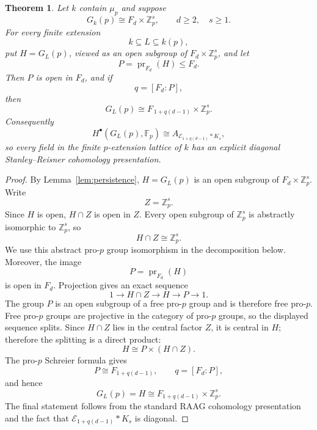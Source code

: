 \documentclass[10pt,a4paper]{amsart}
\newtheorem{theorem}{Theorem}
\newcommand{\Fp}{\mathbb{F}_p}
\begin{document}
\begin{theorem}
\label{thm:split-raag-lattice}
Let \(k\) contain \(\mu_p\) and suppose
\[
G_k(p)\cong F_d\times\mathbb Z_p^s,
\qquad d\ge2,\quad s\ge1.
\]
For every finite extension
\[
k\subseteq L\subseteq k(p),
\]
put \(H=G_L(p)\), viewed as an open subgroup of
\(F_d\times\mathbb Z_p^s\), and let
\[
P=\operatorname{pr}_{F_d}(H)\le F_d.
\]
Then \(P\) is open in \(F_d\), and if
\[
q=[F_d:P],
\]
then
\[
G_L(p)\cong F_{\,1+q(d-1)}\times\mathbb Z_p^s.
\]
Consequently
\[
H^\bullet(G_L(p),\Fp)
\cong
A_{\mathcal E_{1+q(d-1)}\ast K_s},
\]
so every field in the finite \(p\)-extension lattice of \(k\) has an
explicit diagonal Stanley--Reisner cohomology presentation.
\end{theorem}

\begin{proof}
By Lemma~\ref{lem:persistence}, \(H=G_L(p)\) is an open subgroup of
\(F_d\times\mathbb Z_p^s\). Write
\[
Z=\mathbb Z_p^s.
\]
Since \(H\) is open, \(H\cap Z\) is open in \(Z\). Every open subgroup
of \(\mathbb Z_p^s\) is abstractly isomorphic to \(\mathbb Z_p^s\), so
\[
H\cap Z\cong\mathbb Z_p^s.
\]
We use this abstract pro-\(p\) group isomorphism in the decomposition below.
Moreover, the image
\[
P=\operatorname{pr}_{F_d}(H)
\]
is open in \(F_d\). Projection gives an exact sequence
\[
1\longrightarrow H\cap Z
\longrightarrow H
\longrightarrow P
\longrightarrow1.
\]
The group \(P\) is an open subgroup of a free pro-\(p\) group and is
therefore free pro-\(p\). Free pro-\(p\) groups are projective in the
category of pro-\(p\) groups, so the displayed sequence splits. Since
\(H\cap Z\) lies in the central factor \(Z\), it is central in \(H\);
therefore the splitting is a direct product:
\[
H\cong P\times(H\cap Z).
\]
The pro-\(p\) Schreier formula gives
\[
P\cong F_{1+q(d-1)},
\qquad q=[F_d:P],
\]
and hence
\[
G_L(p)=H\cong F_{1+q(d-1)}\times\mathbb Z_p^s.
\]
The final statement follows from the standard RAAG cohomology
presentation and the fact that
\(\mathcal E_{1+q(d-1)}\ast K_s\) is diagonal.
\end{proof}
\end{document}
